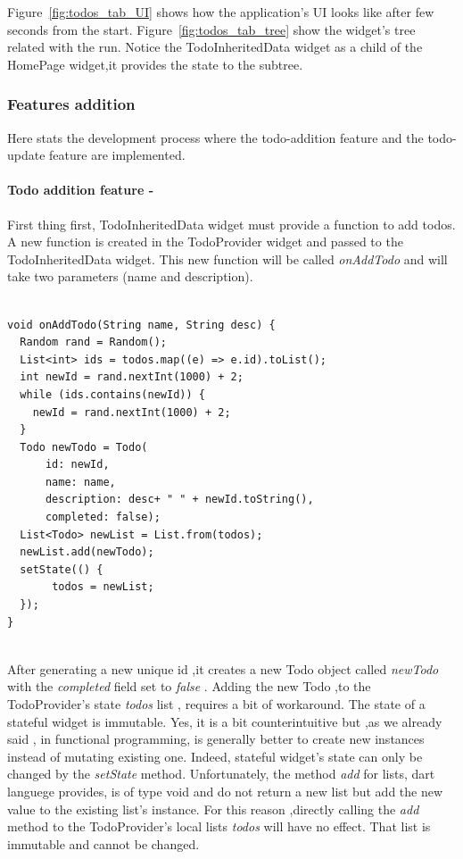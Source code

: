 Figure~\ref{fig:todos_tab_UI} shows how the application's UI looks like after few seconds from the start. Figure~\ref{fig:todos_tab_tree} show the widget's tree related with the run. Notice the TodoInheritedData widget as a child of the HomePage widget,it provides the state to the subtree.




\subsubsection{Features addition} 
\label{par:feature_addition_inherited_widget}
Here stats the development process where the todo-addition feature and the todo-update feature are implemented.

\paragraph{Todo addition feature - } 
\label{subpar: todo_addition_feature_inherited_widget}
First thing first, TodoInheritedData widget must provide a function to add todos. A new function is created in the TodoProvider widget and passed to the TodoInheritedData widget. This new function will be called \textit{onAddTodo} and will take two parameters (name and description).
\mbox{}\\
\mbox{}
\begin{code}
\label{code:2.32}
\begin{verbatim}

void onAddTodo(String name, String desc) {
  Random rand = Random();
  List<int> ids = todos.map((e) => e.id).toList();
  int newId = rand.nextInt(1000) + 2;
  while (ids.contains(newId)) {
    newId = rand.nextInt(1000) + 2;
  }
  Todo newTodo = Todo(
      id: newId,
      name: name,
      description: desc+ " " + newId.toString(),
      completed: false);
  List<Todo> newList = List.from(todos);
  newList.add(newTodo);
  setState(() {
       todos = newList;
  });
}
\end{verbatim}
\end{code}
\mbox{}\\
After generating a new unique id ,it creates a new Todo object called \textit{newTodo }with the \textit{completed }field set to \textit{false }. Adding the new Todo ,to the TodoProvider’s state \textit{todos }list , requires a bit of workaround. The state of a stateful widget is immutable. Yes, it is a bit counterintuitive but ,as we already said , in functional programming, is generally better to create new instances instead of mutating existing one. Indeed, stateful widget's state can only be changed by the \textit{setState } method. Unfortunately, the method \textit{add} for lists, dart languege provides, is of type void and do not return a new list but add the new value to the existing list's instance. For this reason ,directly calling the \textit{add} method to the TodoProvider’s local lists \textit{todos }will have no effect. That list is immutable and cannot be changed.
